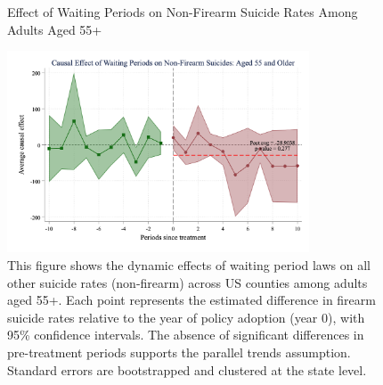 \begin{figure}[htbp]
    \centering
    \caption{Effect of Waiting Periods on Non-Firearm Suicide Rates Among Adults Aged 55+}
    \label{fig:firearm_suicide_DID_other_age55plus}
    \includegraphics[width=0.8\textwidth]{figures/1041-csid-age_55p-other-noNY.png}
    \begin{minipage}{\linewidth}
    \caption*{\footnotesize{
    This figure shows the dynamic effects of waiting period laws on all other suicide rates (non-firearm) across US counties among adults aged 55+. Each point represents the estimated difference in firearm suicide rates relative to the year of policy adoption (year 0), with 95\% confidence intervals. The absence of significant differences in pre-treatment periods supports the parallel trends assumption. Standard errors are bootstrapped and clustered at the state level. }}
  \end{minipage}
\end{figure}

\pagebreak
\clearpage

